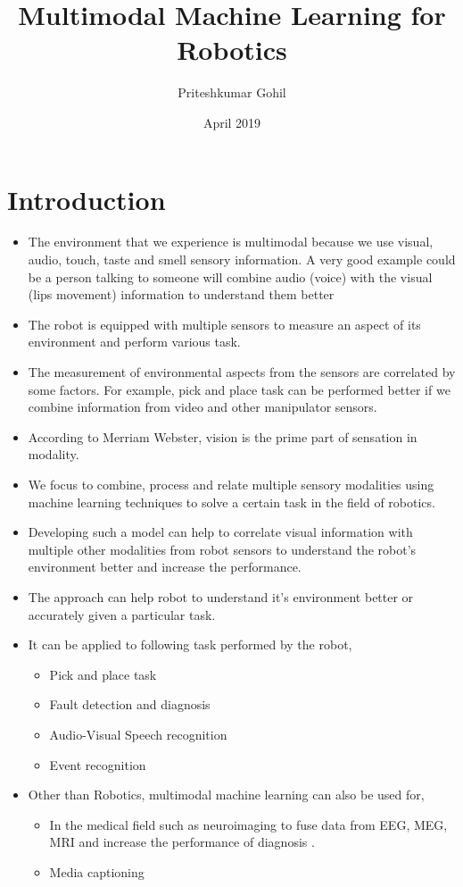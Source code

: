 \documentclass[rnd]{mas_proposal}
\title{Multimodal Machine Learning for Robotics}
\author{Priteshkumar Gohil}
\date{April 2019}
\begin{document}
\maketitle

\pagestyle{plain}

\chapter{Introduction}
\begin{itemize}
    \item The environment that we experience is multimodal because we use visual, audio, touch, taste and smell sensory information. A very good example could be a person talking to someone will combine audio (voice) with the visual (lips movement) information to understand them better
    \item The robot is equipped with multiple sensors to measure an aspect of its environment and perform various task. 
    \item The measurement of environmental aspects from the sensors are correlated by some factors. For example, pick and place task can be performed better if we combine information from video and other manipulator sensors.
    \item According to Merriam Webster, vision is the prime part of sensation in modality.
    \item We focus to combine, process and relate multiple sensory modalities using machine learning techniques to solve a certain task in the field of robotics.
    \item Developing such a model can help to correlate visual information with multiple other modalities from robot sensors to understand the robot's environment better and increase the performance.
    
    \item The approach can help robot to understand it's environment better or accurately given a particular task.
	\item It can be applied to following task performed by the robot,
	\begin{itemize}
		\item Pick and place task
		\item Fault detection and diagnosis
		\item Audio-Visual Speech recognition
		\item Event recognition
	\end{itemize}
	\item Other than Robotics, multimodal machine learning can also be used for,
	\begin{itemize}
		\item In the medical field such as neuroimaging to fuse data from EEG, MEG, MRI and increase the performance of diagnosis \cite{Daehne2015}.
		\item Media captioning
	\end{itemize}
\end{itemize}
\end{document}

